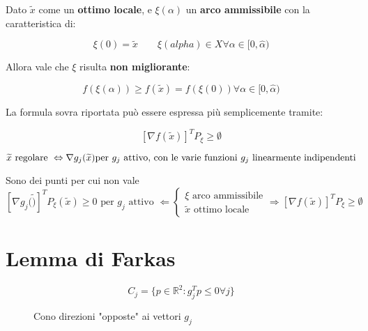 \documentclass[\main/main.tex]{subfiles}
\begin{document}
Dato $\widetilde{x}$ come un \textbf{ottimo locale}, e $\xi(\alpha)$ un \textbf{arco ammissibile} con la caratteristica di:

\[
	\xi(0) = \widetilde{x} \qquad
	\xi(alpha) \in X \forall \alpha \in [0, \widehat{\alpha})
\]

Allora vale che $\xi$ risulta \textbf{non migliorante}:

\[
	f(\xi(\alpha)) \geq f(\widetilde{x}) = f(\xi(0)) \forall \alpha \in [0, \widehat{\alpha})
\]

La formula sovra riportata può essere espressa più semplicemente tramite:

\[
	[\nabla f(\widetilde{x})]^T P_{\xi} \geq \emptyset
\]

\begin{definition}
	\[
		\widetilde{x} \text{ regolare } \Leftrightarrow \nabla g_j (\widetilde{x}) \text{per $ g_j$ attivo, con le varie funzioni $g_j$ linearmente indipendenti}
	\]
\end{definition}

\begin{definition}
	Sono dei punti per cui non vale
	\[
		[\nabla g_j (\widetilde)]^T P_\xi (\widetilde{x}) \geq 0 \text{ per $g_j$ attivo } \Leftarrow 	\begin{cases}
			\xi \text{ arco ammissibile} \\
			\widetilde{x} \text{ ottimo locale}
		\end{cases}
		\Rightarrow
		[\nabla f(\widetilde{x})]^T P_{\xi} \geq \emptyset
	\]
\end{definition}

\begin{center}
\end{center}

\section{Lemma di Farkas}

\begin{figure}[H]
	\[
		C_j = \{ p \in \mathbb{R}^2: g_j^T p \leq 0 \forall j \}
	\]
	\caption{Cono direzioni "opposte" ai vettori $g_j$}
\end{figure}
\end{document}
